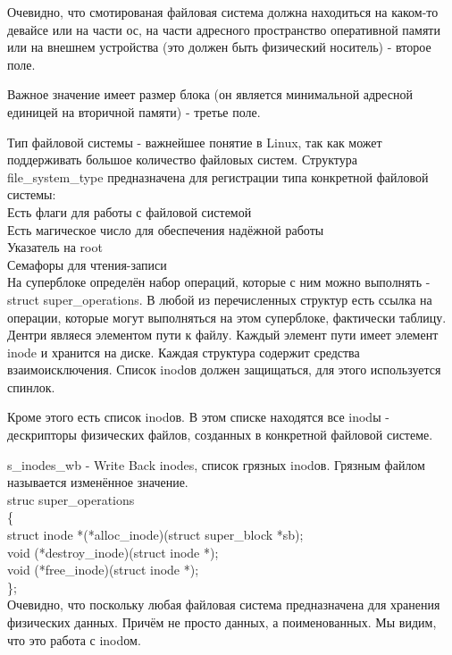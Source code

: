 Очевидно, что смотированая файловая система должна находиться на каком-то девайсе или на части ос, на части адресного пространство оперативной памяти или на внешнем устройства (это должен быть физический носитель) - второе поле.

Важное значение имеет размер блока (он является минимальной адресной единицей на вторичной памяти) - третье поле.

Тип файловой системы - важнейшее понятие в Linux, так как может поддерживать большое количество файловых систем. Структура file\_system\_type предназначена для регистрации типа конкретной файловой системы:\\
Есть флаги для работы с файловой системой\\
Есть магическое число для обеспечения надёжной работы\\
Указатель на root\\
Семафоры для чтения-записи\\

На суперблоке определён набор операций, которые с ним можно выполнять - struct super\_operations. В любой из перечисленных структур есть ссылка на операции, которые могут выполняться на этом суперблоке, фактически таблицу. Дентри являеся элементом пути к файлу. Каждый элемент пути имеет элемент inode и хранится на диске. Каждая структура содержит средства взаимоисключения. Список inodов должен защищаться, для этого используется спинлок.

Кроме этого есть список inodов. В этом списке находятся все inodы - дескрипторы физических файлов, созданных в конкретной файловой системе. 

s\_inodes\_wb - Write Back inodes, список грязных inodов. Грязным файлом называется изменённое значение.\\
struc super\_operations\\
\{\\
	struct inode *(*alloc\_inode)(struct super\_block *sb);\\
	void (*destroy\_inode)(struct inode *);\\
	void (*free\_inode)(struct inode *);\\
\};\\

Очевидно, что поскольку любая файловая система предназначена для хранения физических данных. Причём не просто данных, а поименованных. Мы видим, что это работа с inodом.